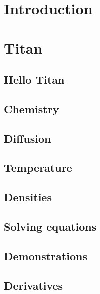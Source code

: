 \documentclass{report}
\begin{document}
\tableofcontents

\part{Introduction}


\part{Titan}
\chapter{Hello Titan}


\chapter{Chemistry}


\chapter{Diffusion}


\chapter{Temperature}


\chapter{Densities}


\chapter{Solving equations}


\appendix
\chapter{Demonstrations}
\label{Titan:the_demo}

\chapter{Derivatives}
\label{Titan:the_derivatives}

\clearpage


\end{document}
